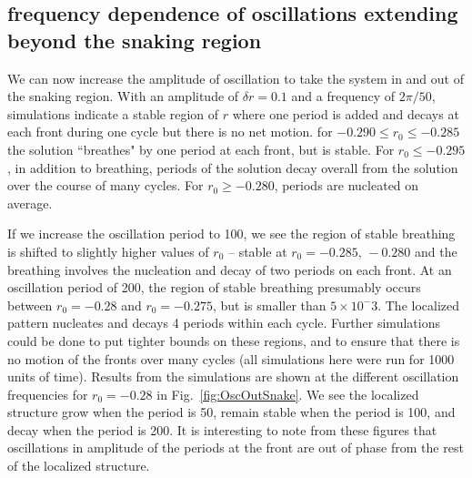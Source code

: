 \documentclass[pre,preprint,superscriptaddress]{revtex4-1}
\begin{document}
\subsection{frequency dependence of oscillations extending beyond the snaking region}
We can now increase the amplitude of oscillation to take the system in and out of the snaking region.  With an amplitude of $\delta r=0.1$ and a frequency of $2\pi/50$, simulations indicate a stable region of $r$ where one period is added and decays at each front during one cycle but there is no net motion. for $ -0.290\le r_0\le-0.285$ the solution ``breathes" by one period at each front, but is stable.  For $r_0 \le -0.295$, in addition to breathing, periods of the solution decay overall from the solution over the course of many cycles. For $r_0 \ge -0.280$,  periods are nucleated on average. 

If we increase the oscillation period to 100, we see the region of stable breathing is shifted to slightly higher values of $r_0$ -- stable at $r_0=-0.285, \, -0.280$ and the breathing involves the nucleation and decay of two periods on each front.  At an oscillation period of 200, the region of stable breathing presumably  occurs between $r_0=-0.28$ and $r_0=-0.275$, but is smaller than $5\times 10^-3$.  The localized pattern nucleates and decays 4 periods within each cycle.  Further simulations could be done to put tighter bounds on these regions, and to ensure that there is no motion of the fronts over many cycles (all simulations here were run for 1000 units of time).   Results from the simulations are shown at the different oscillation frequencies for $r_0=-0.28$ in Fig.~\ref{fig:OscOutSnake}.  We see the localized structure grow when the period is 50, remain stable when the period is 100, and decay when the period is 200.   It is interesting to note from these figures that oscillations in amplitude of the periods at the front are out of phase from the rest of the localized structure.
\end{document}
